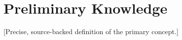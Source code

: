 \section{Preliminary Knowledge}
\label{sec:preliminaries}

\begin{definition}
\label{def:primary-concept}
[Precise, source-backed definition of the primary concept.]
\end{definition}

